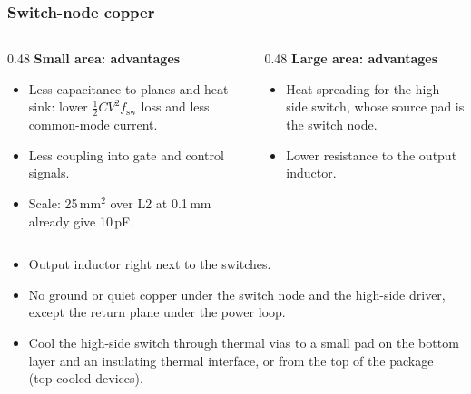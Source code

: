 \begin{frame}
	\frametitle{Switch-node copper}
	\begin{columns}[T]
		\begin{column}{0.48\textwidth}
			\textbf{Small area: advantages}
			\begin{itemize}
				\item Less capacitance to planes and heat sink: lower $\frac12CV^2f_\mathrm{sw}$ loss and less common-mode current.
				\item Less coupling into gate and control signals.
				\item Scale: 25\,mm$^2$ over L2 at 0.1\,mm already give 10\,pF.
			\end{itemize}
		\end{column}
		\begin{column}{0.48\textwidth}
			\textbf{Large area: advantages}
			\begin{itemize}
				\item Heat spreading for the high-side switch, whose source pad is the switch node.
				\item Lower resistance to the output inductor.
			\end{itemize}
		\end{column}
	\end{columns}
	\vspace{0.4em}
	\begin{itemize}
		\item Output inductor right next to the switches.
		\item No ground or quiet copper under the switch node and the high-side driver, except the return plane under the power loop.
		\item Cool the high-side switch through thermal vias to a small pad on the bottom layer and an insulating thermal interface, or from the top of the package (top-cooled devices).
	\end{itemize}
\end{frame}

